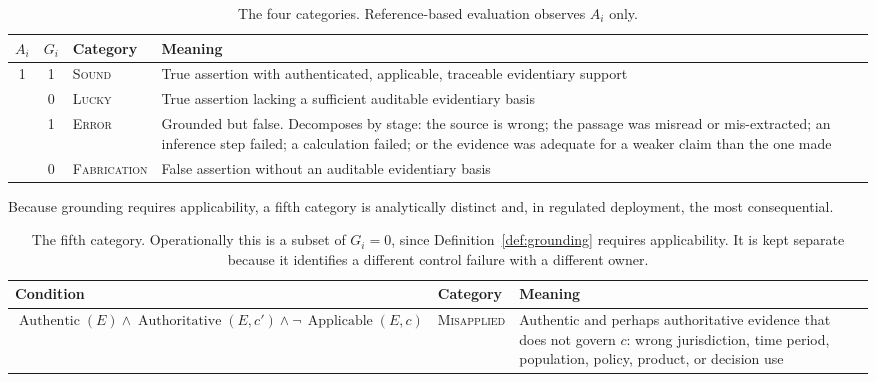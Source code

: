 \documentclass[11pt]{article}
\newcommand{\Applicable}{\operatorname{Applicable}}
\newcommand{\Authentic}{\operatorname{Authentic}}
\newcommand{\Authoritative}{\operatorname{Authoritative}}
\theoremstyle{plain}
\theoremstyle{definition}
\begin{document}
\begin{table}[ht]
  \centering
  \begin{tabular}{@{}cc>{\raggedright\arraybackslash}p{2.4cm}>{\raggedright\arraybackslash}p{7.4cm}@{}}
    \toprule
    $A_i$ & $G_i$ & Category & Meaning \\
    \midrule
    1 & 1 & \textsc{Sound}
      & True assertion with authenticated, applicable, traceable evidentiary
        support \\
    \addlinespace
    1 & 0 & \textsc{Lucky}
      & True assertion lacking a sufficient auditable evidentiary basis \\
    \addlinespace
    0 & 1 & \textsc{Error}
      & Grounded but false. Decomposes by stage: the source is wrong; the passage
        was misread or mis-extracted; an inference step failed; a calculation
        failed; or the evidence was adequate for a weaker claim than the one made \\
    \addlinespace
    0 & 0 & \textsc{Fabrication}
      & False assertion without an auditable evidentiary basis \\
    \bottomrule
  \end{tabular}
  \caption{The four categories. Reference-based evaluation observes $A_i$ only.}
  \label{tab:taxonomy}
\end{table}

Because grounding requires applicability, a fifth category is analytically
distinct and, in regulated deployment, the most consequential.

\begin{table}[ht]
  \centering
  \begin{tabular}{@{}>{\raggedright\arraybackslash}p{5.6cm}>{\raggedright\arraybackslash}p{2.2cm}>{\raggedright\arraybackslash}p{5.4cm}@{}}
    \toprule
    Condition & Category & Meaning \\
    \midrule
    $\Authentic(E) \wedge \Authoritative(E, c') \wedge \neg\,\Applicable(E, c)$
      & \textsc{Misapplied}
      & Authentic and perhaps authoritative evidence that does not govern $c$:
        wrong jurisdiction, time period, population, policy, product, or decision
        use \\
    \bottomrule
  \end{tabular}
  \caption{The fifth category. Operationally this is a subset of
    $G_i = 0$, since Definition~\ref{def:grounding} requires applicability. It is
    kept separate because it identifies a different control failure with a
    different owner.}
  \label{tab:misapplied}
\end{table}
\end{document}
